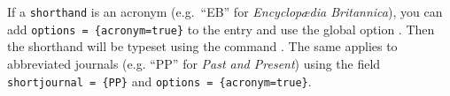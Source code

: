 \documentclass[english]{scrartcl}
\begin{document}
If a \texttt{shorthand} is an acronym (e.g.\ \enquote{EB} for \emph{Encyclopædia Britannica}),
you can add \texttt{options\,=\,\{acronym=true\}} to the entry and use the global
option . Then the shorthand will be typeset using the
command . The same applies to abbreviated journals (e.g.
\enquote{PP} for \emph{Past and Present}) using the field \texttt{shortjournal\,=\,\{PP\}}
and \texttt{options\,=\,\{acronym=true\}}.
\end{document}
